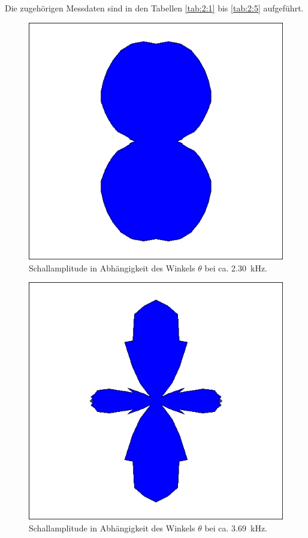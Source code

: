 Die zugehörigen Messdaten sind in den Tabellen \ref{tab:2:1} bis \ref{tab:2:5} aufgeführt.
\begin{figure}
\centering
\includegraphics[width=\textwidth]{content/messungen/Chapter2new/2_3_1.jpg}
\caption{Schallamplitude in Abhängigkeit des Winkels $\theta$ bei ca. 2.30~kHz.}
\label{fig:2_3_1}
\end{figure}

\begin{figure}
\centering
\includegraphics[width=\textwidth]{content/messungen/Chapter2new/2_3_2.jpg}
\caption{Schallamplitude in Abhängigkeit des Winkels $\theta$ bei ca. 3.69~kHz.}
\label{fig:2_3_2}
\end{figure}

